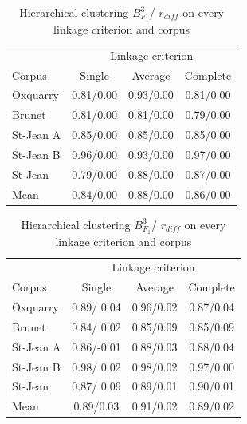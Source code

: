 \begin{table}
  \centering
  \caption{Hierarchical clustering $B^3_{F_1}$/ $r_{diff}$ on every linkage criterion and corpus}
  \label{tab:hierarchical_clustering}

  \label{tab:hierarchical_clustering_rdiff_zero}
  \begin{tabular}{l c c c}
    \toprule
           & \multicolumn{3}{c}{Linkage criterion} \\
    Corpus    & Single    & Average   & Complete \\
    \midrule
    Oxquarry  & 0.81/0.00 & 0.93/0.00 & 0.81/0.00 \\
    Brunet    & 0.81/0.00 & 0.81/0.00 & 0.79/0.00 \\
    St-Jean A & 0.85/0.00 & 0.85/0.00 & 0.85/0.00 \\
    St-Jean B & 0.96/0.00 & 0.93/0.00 & 0.97/0.00 \\
    St-Jean   & 0.79/0.00 & 0.88/0.00 & 0.87/0.00 \\
    \midrule
    Mean      & 0.84/0.00 & 0.88/0.00 & 0.86/0.00 \\
    \bottomrule
  \end{tabular}

  \vspace{0.5cm}

  \label{tab:hierarchical_clustering_best_bcubed}
  \begin{tabular}{l c c c}
    \toprule
           & \multicolumn{3}{c}{Linkage criterion} \\
    Corpus    & Single     & Average   & Complete \\
    \midrule
    Oxquarry  & 0.89/ 0.04 & 0.96/0.02 & 0.87/0.04 \\
    Brunet    & 0.84/ 0.02 & 0.85/0.09 & 0.85/0.09 \\
    St-Jean A & 0.86/-0.01 & 0.88/0.03 & 0.88/0.04 \\
    St-Jean B & 0.98/ 0.02 & 0.98/0.02 & 0.97/0.00 \\
    St-Jean   & 0.87/ 0.09 & 0.89/0.01 & 0.90/0.01 \\
    \midrule
    Mean      & 0.89/0.03 & 0.91/0.02 & 0.89/0.02 \\
    \bottomrule
  \end{tabular}

\end{table}

